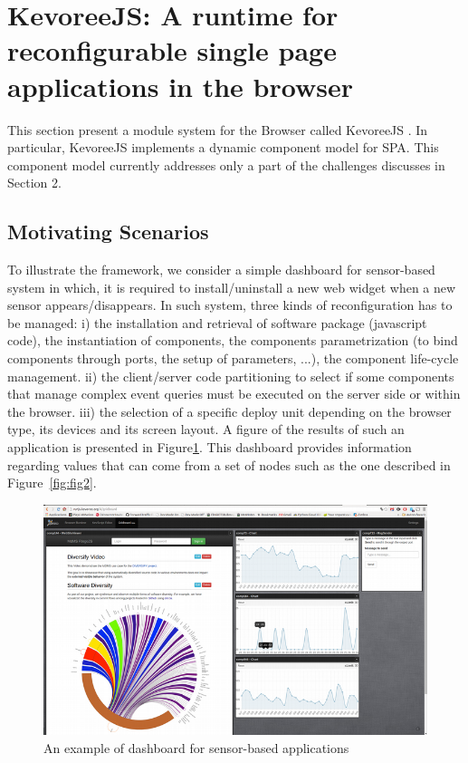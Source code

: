 \section{KevoreeJS: A runtime for reconfigurable single page applications in the browser}

This section present a module system for the Browser called KevoreeJS . 
In particular, KevoreeJS implements a dynamic component model for SPA. 
This component model currently addresses only a part of the challenges discusses in Section 2.   

\subsection{Motivating Scenarios }
To illustrate the framework, we consider a simple dashboard for sensor-based system in which, it is required to install/uninstall a new web widget when a new sensor appears/disappears. In such system, three kinds of reconfiguration has to be managed: i) the installation and retrieval of software package (javascript code), the instantiation of components, the components parametrization (to bind components through ports, the setup of parameters, ...), the component life-cycle management. ii)  the client/server code partitioning to select if some components that manage complex event queries must be executed on the server side or within the browser. iii) the selection of a specific  deploy unit depending on the browser type, its devices and its screen layout. A figure of the results of such an application is presented in Figure\ref{fig:fig1}.   This dashboard provides information regarding values that can come from a set of nodes such as the one described in Figure~\ref{fig:fig2}.


\begin{figure}[h]
	\centering
	\includegraphics[width=1\linewidth]{figures/fig3}
	\caption{An example of dashboard for sensor-based applications}
	\label{fig:fig1}
\end{figure}


